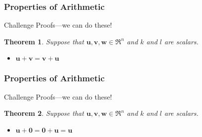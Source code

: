 \documentclass{beamer}
\newtheorem{thm}{Theorem}
\numberwithin{equation}{section}
\begin{document}
\begin{frame}
\frametitle{Properties of Arithmetic} 
\alert{Challenge Proofs}---we can do these!
\begin{thm} Suppose that $\boldsymbol{u}, \boldsymbol{v},\boldsymbol{w} \in \Re^{n}$ and $k$ and $l$ are scalars.  


\begin{itemize}
\item[a)] $\boldsymbol{u} + \boldsymbol{v}  =  \boldsymbol{v} + \boldsymbol{u}$
\end{itemize}
\end{thm} 

\pause 


\end{frame}


\begin{frame}
\frametitle{Properties of Arithmetic} 
\alert{Challenge Proofs}---we can do these!
\begin{thm} Suppose that $\boldsymbol{u}, \boldsymbol{v},\boldsymbol{w} \in \Re^{n}$ and $k$ and $l$ are scalars.  


\begin{itemize}
\item[b)] $\boldsymbol{u} + \boldsymbol{0}  =  \boldsymbol{0} + \boldsymbol{u} = \boldsymbol{u} $
\end{itemize}
\end{thm} 
\pause 
{}
\end{frame}
\end{document}
